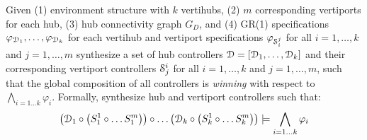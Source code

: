 


Given (1) environment structure with $k$ vertihubs, (2) $m$ corresponding vertiports for each hub, (3) hub connectivity graph $G_D$, and (4) GR(1) specifications $\varphi_{\mathcal{D}_1},\dots, \varphi_{\mathcal{D}_k}$ for each vertihub and vertiport specifications $\varphi_{\mathcal{S}_i^j}$ for all $i = 1,\ldots,k$ and $j=1,\ldots,m$ synthesize a set of hub controllers $\mathcal{D} = [\mathcal{D}_1, \ldots, \mathcal{D}_k]$ and their corresponding vertiport controllers $\mathcal{S}^i_j$ for all $i = 1,\dots, k$ and $j = 1,\dots, m$, such that the global composition of all controllers is \emph{winning} with respect to $\bigwedge_{i=1\dots k}\varphi_i$.
Formally, synthesize hub and vertiport controllers such that:
\begin{equation}\label{eq:problem}
\left( \mathcal{D}_1 \circ \left( S_1^1 \circ \dots S_1^m \right) \right) \circ \dots \left( \mathcal{D}_k \circ \left( S_k^1 \circ \dots S_k^m \right) \right) \models \bigwedge_{i=1\dots k}\varphi_i
\end{equation}





